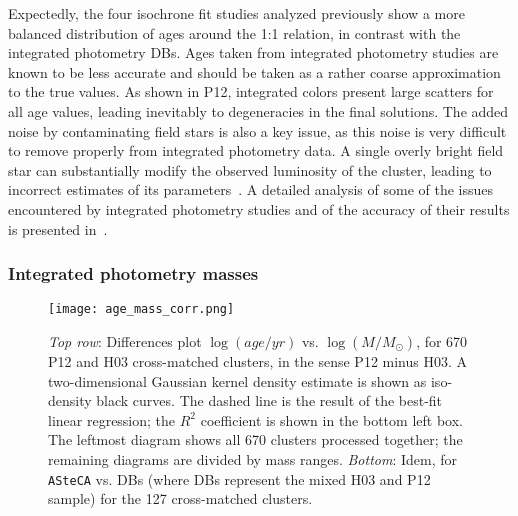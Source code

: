 \documentclass{aa}
\begin{document}
Expectedly, the four isochrone fit studies analyzed previously show a more
balanced distribution of ages around the 1:1 relation, in contrast with the
integrated photometry DBs. Ages taken from integrated photometry studies are
known to be less accurate and should be taken as a rather coarse approximation
to the true values.
%
As shown in P12, integrated colors present large scatters for all age values,
leading inevitably to degeneracies in the final solutions.
The added noise by contaminating field stars is also a key issue, as this noise is
very difficult to remove properly from integrated photometry data. A
single overly bright field star can substantially modify the observed
luminosity of the cluster, leading to incorrect estimates of its
parameters~\citep{Baumgardt_2013,Piatti_2014_B88}.
A detailed analysis of some of the issues encountered by integrated photometry
studies and of the accuracy of their results is presented in~\cite{Anders_2013}.



\subsubsection{Integrated photometry masses}
\label{sssec:integ_photom_masses}
%
%
%
%

\begin{figure*}
\centering
\texttt{[image: age\_mass\_corr.png]}
\caption{\emph{Top row}: Differences plot $\log(age/yr)$ vs.
$\log(M/M_{\odot})$, for 670 P12 and H03 cross-matched clusters, in the sense
P12 minus H03.
A two-dimensional Gaussian kernel density estimate is shown as iso-density black
curves. The dashed line is the result of the best-fit linear regression;
the $R^2$ coefficient is shown in the bottom left box.
The leftmost diagram shows all 670 clusters processed together; the remaining
diagrams are divided by mass ranges.
\emph{Bottom}: Idem, for \texttt{ASteCA} vs. DBs (where DBs represent the
mixed H03 and P12 sample) for the 127 cross-matched clusters.}
\label{fig:age_mass_corr}
\end{figure*}
\end{document}
